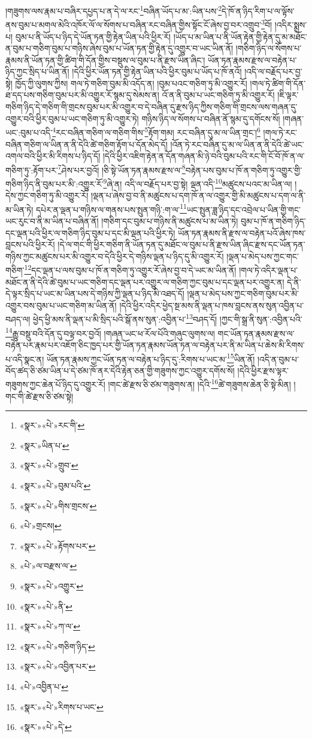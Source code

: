 །གཟུགས་ལས་རྣམ་པ་བཞིར་དཔྱད་པ་ན་དེ་ལ་རང་\footnote{«སྣར་»«པེ་»རང་གི་}བཞིན་ཡོད་པ་མ་:ཡིན་པས་\footnote{«སྣར་»ཡིན་པ་}དེ་ཁོ་ན་ཉིད་རིག་པ་ལ་ལྟོས་ནས་བུམ་པ་མགལ་མེའི་འཁོར་ལོ་ལ་སོགས་པ་བཞིན་རང་བཞིན་གྱིས་སྟོང་ངོ་ཞེས་བྱ་བར་འགྲུབ་\footnote{«སྣར་»«པེ་»གྲུབ་}བོ། །འདིར་སྨྲས་པ། བུམ་པ་ནི་ཡོད་པ་ཉིད་དེ་ཡོན་ཏན་གྱི་རྟེན་ཡིན་པའི་ཕྱིར་རོ། །ཡོད་པ་མ་ཡིན་པ་ནི་ཡོན་རྟེན་གྱི་རྟེན་དུ་མ་མཐོང་ན་བུམ་པ་གཅིག་བུམ་པ་གཉིས་ཞེས་བུམ་པ་ཡོན་ཏན་གྱི་རྟེན་དུ་འགྱུར་བ་ཡང་ཡིན་ནོ། །གཅིག་ཉིད་ལ་སོགས་པ་རྣམས་ནི་ཡོན་ཏན་གྱི་ཚིག་གི་དོན་གྱིས་བསྡུས་ལ་བུམ་པ་ནི་རྫས་ཡིན་ཞིང་། ཡོན་ཏན་རྣམས་རྫས་ལ་བརྟེན་པ་ཉིད་ཀྱང་སྲིད་པ་ཡིན་ནོ། །དེའི་ཕྱིར་ཡོན་ཏན་གྱི་རྟེན་ཡིན་པའི་ཕྱིར་བུམ་པ་ཡོད་པ་ཁོ་ནའོ། །འདི་ལ་བརྗོད་པར་བྱ་སྟེ། ཁྱོད་ཀྱི་ལུགས་ཀྱིས། གལ་ཏེ་གཅིག་བུམ་མི་འདོད་ན། །བུམ་པའང་གཅིག་ཏུ་མི་འགྱུར་རོ། །གལ་ཏེ་ཚིག་གི་དོན་ཐ་དད་པས་གཅིག་བུམ་པར་མི་འགྱུར་རོ་སྙམ་དུ་སེམས་ན། འོ་ན་ནི་བུམ་པ་ཡང་གཅིག་ཏུ་མི་འགྱུར་རོ། །ཇི་ལྟར་གཅིག་ཉིད་དེ་གཅིག་གི་གྲངས་བུམ་པར་མི་འགྱུར་བ་དེ་བཞིན་དུ་རྫས་ཉིད་ཀྱིས་གཅིག་གི་གྲངས་ལས་གཞན་དུ་འགྱུར་བའི་ཕྱིར་བུམ་པ་ཡང་གཅིག་ཏུ་མི་འགྱུར་ཏེ། གཉིས་ཉིད་ལ་སོགས་པ་བཞིན་ནོ་སྙམ་དུ་དགོངས་སོ། །གཞན་ཡང་:བུམ་པ་འདི་\footnote{«སྣར་»«པེ་»བུམ་པའི་}རང་བཞིན་གཅིག་ལ་གཅིག་གིས་\footnote{«སྣར་»«པེ་»གིས་གྲངས་}རྟོག་གམ། རང་བཞིན་དུ་མ་ལ་ཡིན་གྲང་།\footnote{«པེ་»གྲངས།} །གལ་ཏེ་རང་བཞིན་གཅིག་ལ་ཡིན་ན་ནི་དེའི་ཚེ་གཅིག་རྟོག་པ་དོན་མེད་དོ། །འོན་ཏེ་རང་བཞིན་དུ་མ་ལ་ཡིན་ན་ནི་དེའི་ཚེ་ཡང་འགལ་བའི་ཕྱིར་མི་རིགས་པ་ཉིད་དོ། །དེའི་ཕྱིར་འཇིག་རྟེན་ན་དོན་གཞན་མི་ཉེ་བའི་བུམ་པའི་རང་གི་ངོ་བོ་ཁོ་ན་ལ་གཅིག་ཏུ་:རྟོག་པར་\footnote{«སྣར་»«པེ་»རྟོགས་པར་}ཤེས་པར་བྱའོ། །ཅི་སྟེ་ཡོན་ཏན་རྣམས་རྫས་ལ་\footnote{«པེ་»ལ་བརྫས་ལ་}བརྟེན་པས་བུམ་པ་ཁོ་ན་གཅིག་ཏུ་འགྱུར་གྱི་གཅིག་ཉིད་ནི་བུམ་པར་མི་:འགྱུར་རོ་\footnote{«སྣར་»«པེ་»འགྱུར་}ཞེ་ན། འདི་ལ་བརྗོད་པར་བྱ་སྟེ། ལྡན་འདི་\footnote{«སྣར་»«པེ་»ནི་}མཚུངས་པའང་མ་ཡིན་ལ། །དེས་ཀྱང་གཅིག་ཏུ་མི་འགྱུར་རོ། །ལྡན་པ་ཞེས་བྱ་བ་ནི་མཚུངས་པ་དག་ཁོ་ན་ལ་འགྱུར་གྱི་མི་མཚུངས་པ་དག་ལ་ནི་མ་ཡིན་ཏེ། དཔེར་ན་ལྡན་པ་གཉིས་ལ་གནས་པས་སྤུན་གཉི་:ག་ལ་\footnote{«སྣར་»«པེ་»ཀ་ལ་}ཡང་སྤུན་ཟླ་ཉིད་དང་འབྲེལ་པ་ཡིན་གྱི་གང་ཡང་རུང་བ་ནི་མ་ཡིན་པ་བཞིན་ནོ། །གཅིག་དང་བུམ་པ་གཉིས་ནི་མཚུངས་པ་མ་ཡིན་ཏེ། བུམ་པ་ཁོ་ན་གཅིག་ཉིད་དང་ལྡན་པའི་ཕྱིར་ལ་གཅིག་ཉིད་བུམ་པ་དང་མི་ལྡན་པའི་ཕྱིར་ཏེ། ཡོན་ཏན་རྣམས་ནི་རྫས་ལ་བརྟེན་པའོ་ཞེས་ཁས་བླངས་པའི་ཕྱིར་རོ། །དེ་ལ་གང་གི་ཕྱིར་གཅིག་ནི་ཡོན་ཏན་དུ་མཐོང་ལ་བུམ་པ་ནི་རྫས་ཡིན་ཞིང་རྫས་དང་ཡོན་ཏན་གཉིས་ཀྱང་མཚུངས་པར་མི་འགྱུར་བ་དེའི་ཕྱིར་དེ་གཉིས་ལྡན་པ་ཉིད་དུ་མི་འགྱུར་རོ། །ལྡན་པ་མེད་པས་ཀྱང་གང་གཅིག་\footnote{«སྣར་»«པེ་»གཅིག་ཉིད་}དང་ལྡན་པ་ལས་བུམ་པ་ཁོ་ན་གཅིག་ཏུ་འགྱུར་རོ་ཞེས་བྱ་བ་དེ་ཡང་མ་ཡིན་ནོ། །གལ་ཏེ་འདིར་ལྡན་པ་མཐོང་ན་ནི་དེའི་ཚེ་བུམ་པ་ཡང་གཅིག་དང་ལྡན་པར་འགྱུར་ལ་གཅིག་ཀྱང་བུམ་པ་དང་ལྡན་པར་འགྱུར་ན། དེ་ནི་དེ་ལྟར་སྲིད་པ་ཡང་མ་ཡིན་པས་དེ་གཉིས་ཀྱི་ལྡན་པ་ཉིད་མི་འཐད་དོ། །ལྡན་པ་མེད་པས་ཀྱང་གཅིག་བུམ་པར་མི་འགྱུར་བས་བུམ་པ་ཡང་གཅིག་མ་ཡིན་ནོ། །དེའི་ཕྱིར་འདིར་ཕྱེད་སྔ་མས་ནི་ལྡན་པ་ཁས་བླངས་ནས་སུན་འབྱིན་པ་བཤད་ལ། ཕྱེད་ཕྱི་མས་ནི་ལྡན་པ་མི་སྲིད་པའི་སྒོ་ནས་སུན་:འབྱིན་པ་\footnote{«སྣར་»«པེ་»འབྱིན་པར་}བཤད་དོ། །ཀྱང་གི་སྒྲ་ནི་སུན་:འབྱིན་པའི་\footnote{«པེ་»འབྱིན་པ་}རྒྱུ་བསྡུ་བའི་དོན་དུ་བལྟ་བར་བྱའོ། །གཞན་ཡང་ཕ་རོལ་པོའི་གཞུང་ལུགས་ལ། གང་ཡོན་ཏན་རྣམས་རྫས་ལ་བརྟེན་པར་རྣམ་པར་འཇོག་ཅིང་ཁྱད་པར་གྱི་ཡོན་ཏན་རྣམས་ཡོན་ཏན་ལ་བརྟེན་པར་ནི་མ་ཡིན་པ་ཆེས་མི་རིགས་པ་འདི་སྣང་ན། ཡོན་ཏན་རྣམས་ཀྱང་ཡོན་ཏན་ལ་བརྟེན་པ་ཉིད་དུ་:རིགས་པ་ཡང་མ་\footnote{«སྣར་»«པེ་»རིགས་པ་ཡང་}ཡིན་ནོ། །འདི་ན་བུམ་པ་བོད་ཚད་ཅི་ཙམ་ཡིན་པ་དེ་ཙམ་ཁོ་ནར་དེའི་རྟེན་ཅན་གྱི་གཟུགས་ཀྱང་འགྱུར་དགོས་སོ། །དེའི་ཕྱིར་རྫས་ལྟར་གཟུགས་ཀྱང་ཆེན་པོ་ཉིད་དུ་འགྱུར་རོ། །གང་ཚེ་རྫས་ཅི་ཙམ་གཟུགས་ན། །དེའི་\footnote{«སྣར་»«པེ་»དེ་}ཚེ་གཟུགས་ཆེན་ཅི་སྟེ་མིན། །གང་གི་ཚེ་རྫས་ཅི་ཙམ་སྟེ། 